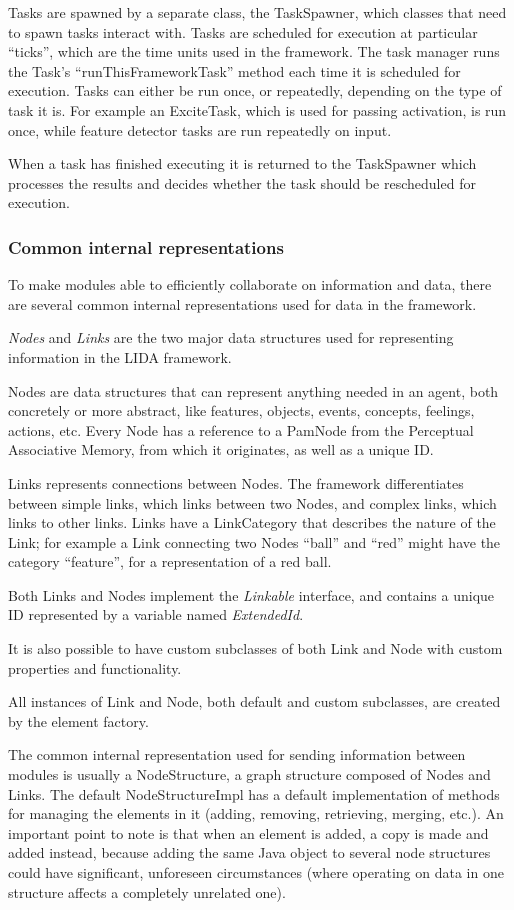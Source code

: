 Tasks are spawned by a separate class, the TaskSpawner, which classes that need to spawn tasks interact with. Tasks are scheduled for execution at particular ``ticks'', which are the time units used in the framework. The task manager runs the Task's ``runThisFrameworkTask'' method each time it is scheduled for execution. Tasks can either be run once, or repeatedly, depending on the type of task it is. For example an ExciteTask, which is used for passing activation, is run once, while feature detector tasks are run repeatedly on input.

When a task has finished executing it is returned to the TaskSpawner which processes the results and decides whether the task should be rescheduled for execution.

\subsubsection{Common internal representations}
To make modules able to efficiently collaborate on information and data, there are several common internal representations used for data in the framework.

{\em Nodes} and {\em Links} are the two major data structures used for representing information in the LIDA framework.

Nodes are data structures that can represent anything needed in an agent, both concretely or more abstract, like features, objects, events, concepts, feelings, actions, etc. Every Node has a reference to a PamNode from the Perceptual Associative Memory, from which it originates, as well as a unique ID.

Links represents connections between Nodes. The framework differentiates between simple links, which links between two Nodes, and complex links, which links to other links. Links have a LinkCategory that describes the nature of the Link; for example a Link connecting two Nodes ``ball'' and ``red'' might have the category ``feature'', for a representation of a red ball. 

Both Links and Nodes implement the {\em Linkable} interface, and contains a unique ID represented by a variable named {\em ExtendedId}.

It is also possible to have custom subclasses of both Link and Node with custom properties and functionality.

All instances of Link and Node, both default and custom subclasses, are created by the element factory.

The common internal representation used for sending information between modules is usually a NodeStructure, a graph structure composed of Nodes and Links. The default NodeStructureImpl has a default implementation of methods for managing the elements in it (adding, removing, retrieving, merging, etc.). An important point to note is that when an element is added, a copy is made and added instead, because adding the same Java object to several node structures could have significant, unforeseen circumstances (where operating on data in one structure affects a completely unrelated one).

